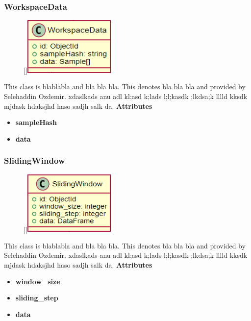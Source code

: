 \subsubsection{WorkspaceData}
\begin{figure}
    \raisebox{0pt}[\dimexpr{}\baselineskip\relax]{\includegraphics[width=4.5cm]{classes/model-management/14.png}}
\end{figure} 
\par
This class is blablabla and bla bla bla. This denotes bla bla bla and provided by Selehaddin Ozdemir. xdaslkads anu adl kl;asd k;lads l;l;kasdk ;lkdsa;k lllld kksdk mjdask hdaksjhd haso sadjh salk da.
\newline
\newline
\textbf{Attributes}
\begin{itemize}
    \item \textbf{sampleHash}
    \item \textbf{data}
\end{itemize}

\subsubsection{SlidingWindow}
\begin{figure}
    \raisebox{0pt}[\dimexpr{}\baselineskip\relax]{\includegraphics[width=4.5cm]{classes/model-management/15.png}}
\end{figure} 
\par
This class is blablabla and bla bla bla. This denotes bla bla bla and provided by Selehaddin Ozdemir. xdaslkads anu adl kl;asd k;lads l;l;kasdk ;lkdsa;k lllld kksdk mjdask hdaksjhd haso sadjh salk da.
\newline
\newline
\textbf{Attributes}
\begin{itemize}
    \item \textbf{window\_size}
    \item \textbf{sliding\_step}
    \item \textbf{data}
\end{itemize}

